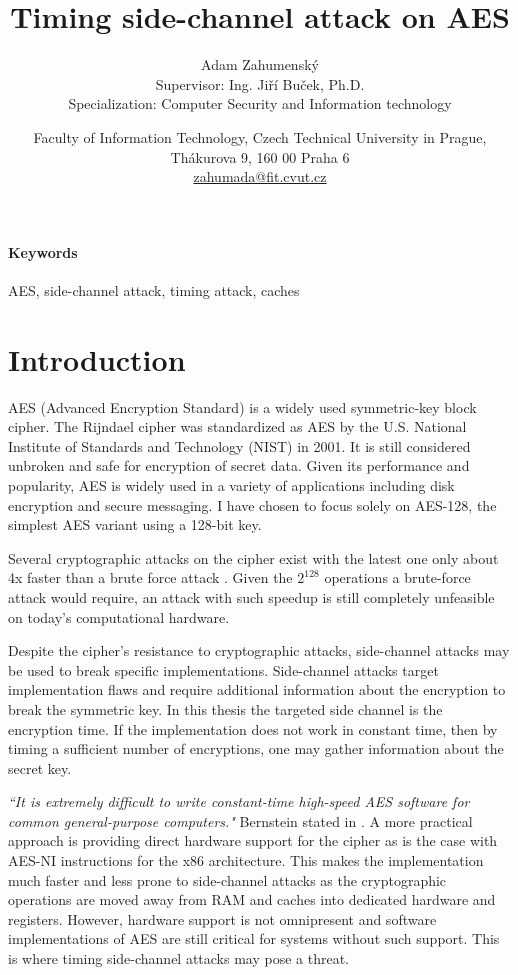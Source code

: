 \documentclass{article}
\title{Timing side-channel attack on AES} %
\author{\small Adam Zahumenský \\\small Supervisor: Ing. Jiří Buček, Ph.D.\\ \small Specialization: Computer Security and Information technology} %
\date{\small Faculty of Information Technology, Czech Technical University in Prague, \\ Thákurova 9, 160 00 Praha 6 \\ \url{zahumada@fit.cvut.cz}}
\begin{document}
\maketitle
\textbf{}
\paragraph{Keywords}{AES, side-channel attack, timing attack, caches}

\section{Introduction}
AES (Advanced Encryption Standard) is a widely used symmetric-key block cipher.
The Rijndael cipher was standardized as AES by the U.S. National Institute of Standards and Technology (NIST) in 2001.
It is still considered unbroken and safe for encryption of secret data.
Given its performance and popularity, AES is widely used in a variety of applications including disk encryption and secure messaging.
I have chosen to focus solely on AES-128, the simplest AES variant using a 128-bit key.

Several cryptographic attacks on the cipher exist with the latest one only about 4x faster than a brute force attack \cite{bogdanov2011biclique}.
Given the $2^{128}$ operations a brute-force attack would require, an attack with such speedup is still completely unfeasible on today's computational hardware.

Despite the cipher's resistance to cryptographic attacks, side-channel attacks may be used to break specific implementations.
Side-channel attacks target implementation flaws and require additional information about the encryption to break the symmetric key.
In this thesis the targeted side channel is the encryption time.
If the implementation does not work in constant time, then by timing a sufficient number of encryptions, one may gather information about the secret key.

\textit{``It is extremely difficult to write constant-time high-speed AES software for common general-purpose computers."} Bernstein stated in \cite[Abstract]{bernstein2005cache}.
A more practical approach is providing direct hardware support for the cipher as is the case with AES-NI instructions for the x86 architecture.
This makes the implementation much faster and less prone to side-channel attacks as the cryptographic operations are moved away from RAM and caches into dedicated hardware and registers.
However, hardware support is not omnipresent and software implementations of AES are still critical for systems without such support.
This is where timing side-channel attacks may pose a threat.
\end{document}
